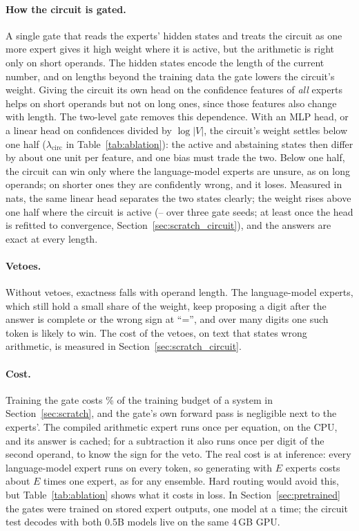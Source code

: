\documentclass[10pt]{article}
\begin{document}
\paragraph{How the circuit is gated.} A single gate that reads the experts' hidden states and
treats the circuit as one more expert gives it high weight where it is active, but the
arithmetic is right only on short operands. The hidden states encode the length of the current
number, and on lengths beyond the training data the gate lowers the circuit's weight. Giving
the circuit its own head on the confidence features of \emph{all} experts helps on short
operands but not on long ones, since those features also change with length. The two-level gate removes this dependence. With an MLP
head, or a linear head on confidences divided by $\log|V|$, the circuit's weight settles below
one half ($\lambda_{\mathrm{circ}}$ in Table~\ref{tab:ablation}): the active and abstaining states then differ by about one unit per feature, and one bias
must trade the two. Below one half, the circuit can win only where the language-model experts
are unsure, as on long operands; on shorter ones they are confidently wrong, and it loses. Measured in
nats, the same linear head separates the two states clearly; the weight rises above one half
where the circuit is active (\resTrackCSeededLambdaMin--\resTrackCSeededLambdaMax{} over three
gate seeds; at least \resTrackCRefitLambdaMin{} once the head is refitted to convergence,
Section~\ref{sec:scratch_circuit}), and the answers are exact at every length.

\paragraph{Vetoes.} Without vetoes, exactness falls with operand length. The language-model
experts, which still hold a small share of the weight, keep proposing a digit after the answer
is complete or the wrong sign at ``='', and over many digits one such token is likely to win.
The cost of the vetoes, on text that states wrong arithmetic, is measured in
Section~\ref{sec:scratch_circuit}.

\paragraph{Cost.} Training the gate costs \resTrackCGateFlopsPct\% of the training budget of a
system in Section~\ref{sec:scratch}, and the gate's own forward pass is negligible next to the
experts'. The compiled arithmetic expert runs once per equation, on the CPU, and its answer is
cached; for a subtraction it also runs once per digit of the second operand, to know the sign
for the veto. The real cost is at inference: every language-model expert runs on every token, so
generating with $E$ experts costs about $E$ times one expert, as for any ensemble. Hard routing
would avoid this, but Table~\ref{tab:ablation} shows what it costs in loss. In
Section~\ref{sec:pretrained} the gates were trained on stored expert outputs, one model at a
time; the circuit test decodes with both 0.5B models live on the same 4\,GB GPU.
\end{document}

